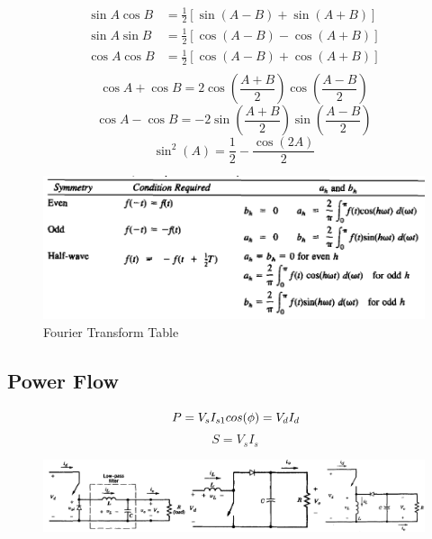 \documentclass[twocolumn, ]{article}
\begin{document}
\begin{align*}
          \sin A \cos B &= \frac{1}{2}\left[ \sin(A-B)+\sin(A+B) \right] \\
          \sin A \sin B &= \frac{1}{2}\left[ \cos(A-B)-\cos(A+B) \right] \\
          \cos A \cos B &= \frac{1}{2}\left[ \cos(A-B)+\cos(A+B) \right] \\     
\end{align*}  
\begin{equation*}
	  \cos A +\cos B = 2\cos(\frac{A+B}{2})\cos(\frac{A-B}{2})
\end{equation*}
\begin{equation*}
	  \cos A -\cos B = -2\sin(\frac{A+B}{2})\sin(\frac{A-B}{2})
\end{equation*}
\begin{equation*}
	\sin^2(A)=\frac{1}{2}-\frac{\cos(2A)}{2}
\end{equation*}
  \begin{figure}[!ht]
	\includegraphics[scale=0.35]{Fourier.png}
	\caption{Fourier Transform Table}
\end{figure}
\subsection*{\small Power Flow}
\begin{equation*}
	\ P=V_{s}I_{s1}cos(\phi)=V_{d}I_{d}\\	
\end{equation*}
\begin{equation*}
	\ S=V_{s}I_{s}	
\end{equation*}

\begin{figure}[!ht]
	\includegraphics[scale=0.3]{buck_boost.jpg}
\end{figure}
\end{document}
